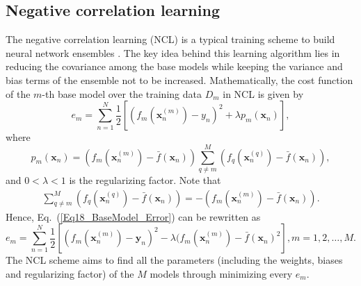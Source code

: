 \documentclass{article}
\begin{document}
\subsection{Negative correlation learning}
The negative correlation learning (NCL) is a typical training scheme to build neural network ensembles \cite{geman1992neural, hansen1990neural}.
The key idea behind this learning algorithm lies in reducing the covariance among the base models while keeping the variance and bias terms of the ensemble not to be increased.
Mathematically, the cost function of the $m$-th base model over the training data $D_m$ in NCL is given by
\begin{equation}
\label{Eq18_BaseModel_Error}
e_m = \sum_{n=1}^N \frac{1}{2} \left[  (f_m(\bm{x}_n^{(m)})- y_n )^2 + \lambda p_m(\bm{x}_n) \right],
\end{equation}
where
\begin{equation}
\label{Eq13_BaseModel_Penalty}
p_m(\bm{x}_n) = (f_m (\bm{x}_n^{(m)}) - \bar{f}(\bm{x}_n) )\sum_{q\neq m}^M (f_{q}(\bm{x}_n^{(q)}) - \bar{f}(\bm{x}_n)),
\end{equation}
and $0<\lambda<1$ is the regularizing factor. 
Note that
\begin{eqnarray}
\label{Eq14_Ensemble_Output_Average}
\sum_{q \neq m}^M (f_{q}(\bm{x}_n^{(q)})-\bar{f}(\bm{x}_n)) = -(f_{m}(\bm{x}_n^{(m)}) - \bar{f}(\bm{x}_n)).
\end{eqnarray}
Hence, Eq.~(\ref{Eq18_BaseModel_Error}) can be rewritten as
\begin{equation}
\label{Eq15_BaseModel_Error_with_penalty_Simple}
e_m = \sum_{n=1}^N \frac{1}{2}  \left[ (f_m(\bm{x}_n^{(m)})- \bm{y}_n )^2 - \lambda  (f_m (\bm{x}^{(m)}_n) - \bar{f}(\bm{x}_n)^2 \right],  m= 1,2,\dots,M.
\end{equation}
The NCL scheme aims to find all the parameters (including the weights, biases and regularizing factor) of the $M$ models through minimizing every $ e_{m}$. 


\end{document}
